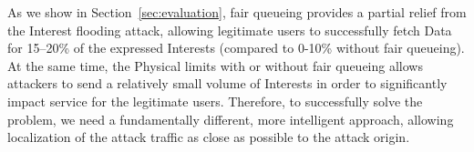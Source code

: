 As we show in Section~\ref{sec:evaluation}, fair queueing provides a partial relief from the Interest flooding attack, allowing legitimate users to successfully fetch Data for 15--20\% of the expressed Interests (compared to 0-10\% without fair queueing).
At the same time, the Physical limits with or without fair queueing allows attackers to send a relatively small volume of Interests in order to significantly impact service for the legitimate users.
Therefore, to successfully solve the problem, we need a fundamentally different, more intelligent approach, allowing localization of the attack traffic as close as possible to the attack origin.

